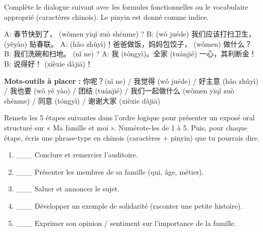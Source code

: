 \documentclass[11pt]{article}
\begin{document}
\begin{exercice}
Complète le dialogue suivant avec les formules fonctionnelles ou le vocabulaire approprié (caractères chinois). Le pinyin est donné comme indice.

\begin{textebox}
A: 春节快到了，\underline{\hspace{3cm}} (wǒmen yīqǐ zuò shénme) ?
B: \underline{\hspace{3cm}} (wǒ juéde) 我们应该打扫卫生，\underline{\hspace{3cm}} (yěyào) 贴春联。
A: \underline{\hspace{3cm}} (hǎo zhǔyì)！爸爸做饭，妈妈包饺子，\underline{\hspace{3cm}} (wǒmen) 做什么？
B: 我们洗碗和扫地。\underline{\hspace{3cm}} (nǐ ne) ?
A: 我\underline{\hspace{3cm}} (tóngyì)。全家\underline{\hspace{3cm}} (tuánjié) 一心，其利断金！
B: 说得好！\underline{\hspace{3cm}} (xièxie dàjiā)！
\end{textebox}

\textbf{Mots-outils à placer :} 你呢？(nǐ ne) / 我觉得 (wǒ juéde) / 好主意 (hǎo zhǔyì) / 我也要 (wǒ yě yào) / 团结 (tuánjié) / 我们一起做什么 (wǒmen yīqǐ zuò shénme) / 同意 (tóngyì) / 谢谢大家 (xièxie dàjiā)
\end{exercice}

\begin{exercice}
Remets les 5 étapes suivantes dans l'ordre logique pour présenter un exposé oral structuré sur « Ma famille et moi ». Numérote-les de 1 à 5. Puis, pour chaque étape, écris une phrase-type en chinois (caractères + pinyin) que tu pourrais dire.

\begin{enumerate}
    \item \_\_\_ Conclure et remercier l'auditoire.
    \item \_\_\_ Présenter les membres de sa famille (qui, âge, métier).
    \item \_\_\_ Saluer et annoncer le sujet.
    \item \_\_\_ Développer un exemple de solidarité (raconter une petite histoire).
    \item \_\_\_ Exprimer son opinion / sentiment sur l'importance de la famille.
\end{enumerate}
\end{exercice}
\end{document}
